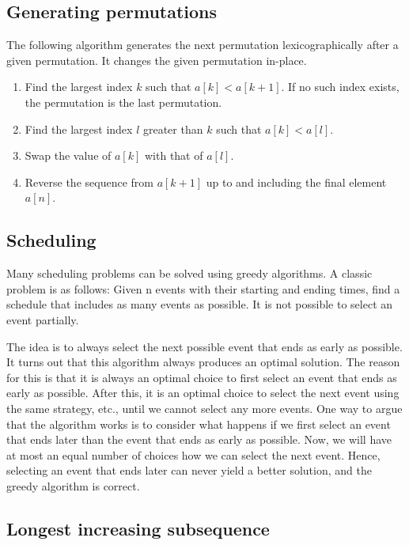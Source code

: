 \documentclass[a4paper]{article}
\begin{document}
\subsection{Generating permutations}
The following algorithm generates the next permutation lexicographically after a given permutation. It changes the given permutation in-place.
\begin{enumerate}
  \item Find the largest index $k$ such that $a[k] < a[k + 1]$. If no such index exists, the permutation is the last permutation.
  \item Find the largest index $l$ greater than $k$ such that $a[k] < a[l]$.
  \item Swap the value of $a[k]$ with that of $a[l]$.
  \item Reverse the sequence from $a[k + 1]$ up to and including the final element $a[n]$.
\end{enumerate}


\subsection{Scheduling}
Many scheduling problems can be solved using greedy algorithms. A classic problem is as follows: Given n events with their starting and ending times, find a schedule that includes as many events as possible. It is not possible to select an event partially.

The idea is to always select the next possible event that ends as early as possible. It turns out that this algorithm always produces an optimal solution. The reason for this is that it is always an optimal choice to first select an event that ends as early as possible. After this, it is an optimal choice to select the next event using the same strategy, etc., until we cannot select any more events. One way to argue that the algorithm works is to consider what happens if we first select an event that ends later than the event that ends as early as possible. Now, we will have at most an equal number of choices how we can select the next event. Hence, selecting an event that ends later can never yield a better solution, and the greedy algorithm is correct.


\subsection{Longest increasing subsequence}

\end{document}
